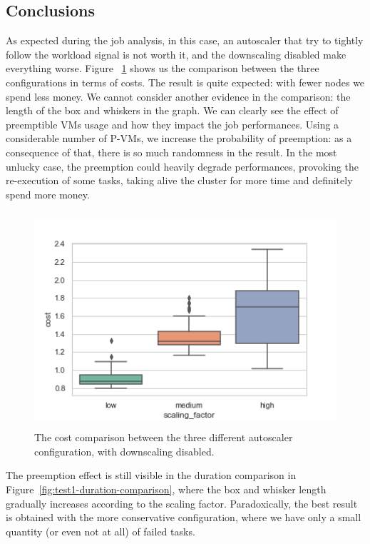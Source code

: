 \documentclass[12pt,twoside,cucitura]{toptesi}
\begin{document}
\subsection{Conclusions}
As expected during the job analysis, in this case, an autoscaler that try to tightly follow the workload signal is not worth it, and the downscaling disabled make everything worse. Figure ~\ref{fig:test1-cost-comparison} shows us the comparison between the three configurations in terms of costs. The result is quite expected: with fewer nodes we spend less money. We cannot consider another evidence in the comparison: the length of the box and whiskers in the graph. We can clearly see the effect of preemptible VMs usage and how they impact the job performances. Using a considerable number of P-VMs, we increase the probability of preemption: as a consequence of that, there is so much randomness in the result. In the most unlucky case, the preemption could heavily degrade performances, provoking the re-execution of some tasks, taking alive the cluster for more time and definitely spend more money. 

\begin{figure}
\centering
\includegraphics[height=80mm]{test1-cost-comparison}
\caption{The cost comparison between the three different autoscaler configuration, with downscaling disabled.}\label{fig:test1-cost-comparison}
\end{figure}

The preemption effect is still visible in the duration comparison in Figure~\ref{fig:test1-duration-comparison}, where the box and whisker length gradually increases according to the scaling factor. Paradoxically, the best result is obtained with the more conservative configuration, where we have only a small quantity (or even not at all) of failed tasks.
\end{document}
